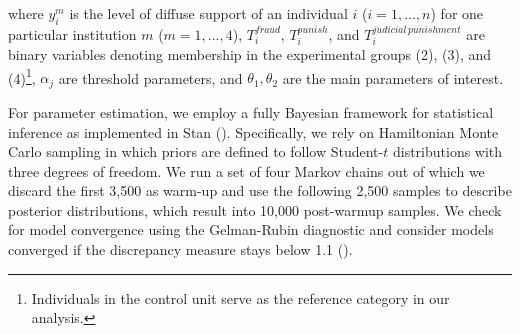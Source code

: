 \documentclass[11pt, ngerman,english,a4]{article}
\begin{document}
\noindent where $y^m_i$ is the level of diffuse support of an individual $i$ ($i=1,...,n$) for one particular institution $m$ ($m=1,...,4$), $T_i^{fraud}$, $T_i^{punish}$, and $T_i^{judicial \, punishment}$ are binary variables denoting membership in the experimental groups (2),  (3), and (4)\footnote{Individuals in the control unit serve as the reference category in our analysis.},
$\alpha_j$ are threshold parameters, 
and $\theta_1, \theta_2$ are the main parameters of interest.

For parameter estimation, we employ a fully Bayesian framework for statistical inference as implemented in Stan (\citealt{StanDevelopmentTeam2020}). 
Specifically, we rely on Hamiltonian Monte Carlo sampling in which priors are defined to follow Student-$t$ distributions with three degrees of freedom.
We run a set of four Markov chains out of which we discard the first 3,500 as warm-up and use the following 2,500 samples to describe posterior distributions, which result into 10,000 post-warmup samples. We check for model convergence using the Gelman-Rubin diagnostic and consider models converged if the discrepancy measure stays below 1.1 (\citealt{Gelman2004}).



\end{document}
